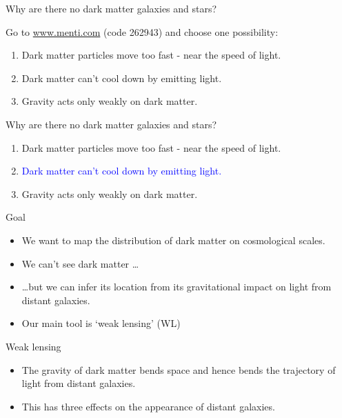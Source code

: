 \documentclass[usenames,dvipsnames]{beamer}
\newcommand{\mentiurl}[0]{{\url{www.menti.com}}}
\newcommand{\menticode}[0]{{262943}}
\newcommand{\mentiinvitation}[0]{Go to \mentiurl{} (code \menticode{}) and choose one possibility:\\}
\newcommand{\correctanswer}[1]{\textcolor{blue}{{#1} \checkmark}}
\begin{document}
\begin{frame}{Why are there no dark matter galaxies and stars?}
  \begin{block}{}
    \mentiinvitation{}
    \begin{enumerate}
      \item{Dark matter particles move too fast - near the speed of light.}
      \item{Dark matter can't cool down by emitting light.}
      \item{Gravity acts only weakly on dark matter.}
    \end{enumerate}
  \end{block}
\end{frame}


\begin{frame}{Why are there no dark matter galaxies and stars?}
  \begin{block}{}
    \begin{enumerate}
      \item{Dark matter particles move too fast - near the speed of light.}
      \item{\correctanswer{Dark matter can't cool down by emitting light.}}
      \item{Gravity acts only weakly on dark matter.}
    \end{enumerate}
  \end{block}
\end{frame}

\begin{frame}{Goal}
  \begin{block}{}
    \begin{itemize}
      \item{We want to map the distribution of dark matter on cosmological scales.}
      \item{We can't see dark matter \ldots}
      \item{\ldots but we can infer its location from its gravitational impact on light from distant galaxies.}
      \item{Our main tool is `weak lensing' (WL)}
    \end{itemize}
  \end{block}
\end{frame}


\begin{frame}{Weak lensing}
  \begin{block}{}
    \begin{itemize}
      \item{The gravity of dark matter bends space and hence bends the trajectory of light from distant galaxies.}
      \item{This has three effects on the appearance of distant galaxies.}
    \end{itemize}
  \end{block}
\end{frame}
\end{document}
